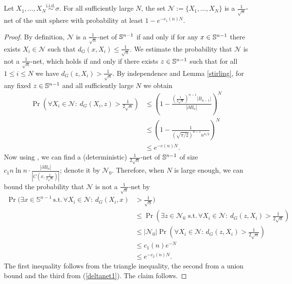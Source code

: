 \begin{lemma}\label{deltanet}
	Let $X_1,\ldots,X_N \stackrel{\text{i.i.d.}}{\sim} \sigma$. For all sufficiently large $N$, the set $\mathcal N:=\{X_1,\ldots,X_N\}$ is a $ \frac{1}{\sqrt{n}}$-net of the unit sphere with probability at least $ 1-e^{-c_1(n)N}.$ 
\end{lemma}
\begin{proof}
	By definition, $\mathcal N$ is a $\frac{1}{\sqrt{n}}$-net of $\mathbb{S}^{n-1}$ if and only if for any $x\in\mathbb{S}^{n-1}$ there exists $X_i\in\mathcal N$ such that $d_G(x,X_i)\leq \frac{1}{\sqrt{n}}$. We estimate the probability that $\mathcal N$ is not a $\frac{1}{\sqrt{n}}$-net, which holds if and only if  there exists $z\in\mathbb{S}^{n-1}$ such that for all $1\leq i\leq N$ we have $d_G(z,X_i)>\frac{1}{\sqrt{n}}$.  By independence and Lemma \ref{stirling}, for any fixed  $ z\in\mathbb{S}^{n-1} $ and all sufficiently large $N$ we obtain
	\begin{align}\label{deltanet1}
	\Pr\left(\forall X_i\in\mathcal{N} :\ d_{G}(X_{i},z)>\frac{1}{2\sqrt{n}}\right) & \leq\left(1-\frac{(\frac{1}{2\sqrt{n}})^{n-1}|B_{n-1}|}{|\partial B_n|}\right)^{N} \nonumber\\
	&\leq \left(1-\frac{1}{(\sqrt{\pi/2})^{n-1}n^{n/2}}\right)^N \nonumber\\
	& \leq e^{-c(n)N}.%
	\end{align}
	Now using \cite[Cor. 5.5]{aubrun2017alice}, we can find a (deterministic) $ \frac{1}{2\sqrt{n}}$-net of $ \mathbb{S}^{n-1} $ of size \\
	$ c_1 n\ln n\cdot\frac{|\partial B_n|}{|C(x,\frac{1}{2\sqrt{n}})|}$; denote it by $ \mathcal{N}_0.$ Therefore, when $N$ is large enough, we can bound the probability that $\mathcal N$ is not a $\frac{1}{\sqrt{n}}$-net by
	\begin{align*}
	\Pr\bigg(\exists x\in\mathbb{S}^{n-1}\,\text{s.t.}\,\forall X_i\in\mathcal N:\ d_{G}(X_{i},x)&>\frac{1}{\sqrt{n}}\bigg) \\
	& \leq\Pr\left(\exists z\in\mathcal{N}_0\,\,\text{s.t.}\,\forall X_i\in\mathcal N:\ d_{G}(z,X_i)>\frac{1}{2\sqrt{n}}\right)\\
	& \leq|\mathcal{N}_0|\Pr\left(\forall X_i\in\mathcal N:\,d_{G}(z,X_{i})>\frac{1}{2\sqrt{n}}\right)\\
	& \leq c_1(n)e^{-N}\\%
	& \leq e^{-c_2(n)N}.
	\end{align*}The first inequality follows from the triangle inequality, the second from a union bound and the third from (\ref{deltanet1}). The claim follows.%
\end{proof}

